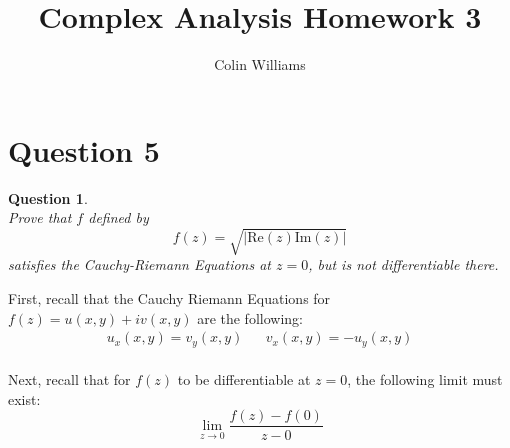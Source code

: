 \documentclass[10pt,a4paper]{article}
\title{Complex Analysis Homework 3}
\author{Colin Williams}
\newtheorem*{question*}{Question}
\begin{document}
\maketitle
\section*{Question 5}

\begin{question*}{$ $}
\\Prove that $f$ defined by
\[f(z) = \sqrt{|\text{Re}(z)\text{Im}(z)|}\]
satisfies the Cauchy-Riemann Equations at $z = 0$, but is not differentiable there. 
\end{question*}
$ $\\First, recall that the Cauchy Riemann Equations for $f(z) = u(x,y)+ iv(x,y)$ are the following:
\begin{align*}
u_x(x, y) = v_y(x, y) && v_x(x,y) = -u_y(x,y)
\end{align*}\\
Next, recall that for $f(z)$ to be differentiable at $z = 0$, the following limit must exist:
\[\lim_{z \to 0}\frac{f(z) - f(0)}{z - 0}\]
\end{document}
